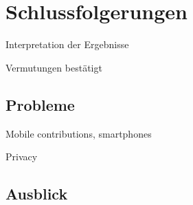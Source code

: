 \chapter{Schlussfolgerungen}\label{ch:conclusion}

\begin{todos}
    \item Interpretation der Ergebnisse
    \item Vermutungen bestätigt
\end{todos}



\section{Probleme}

\begin{todos}
    \item Mobile contributions, smartphones
    \item Privacy
\end{todos}

\section{Ausblick}
